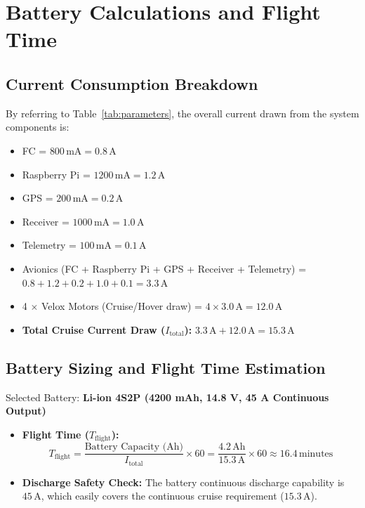 \documentclass[11pt,a4paper]{article}
\begin{document}
\clearpage

\section{Battery Calculations and Flight Time}

\subsection{Current Consumption Breakdown}
By referring to Table~\ref{tab:parameters}, the overall current drawn from the system components is:
\begin{itemize}
    \item FC = $800\,\text{mA} = 0.8\,\text{A}$
    \item Raspberry Pi = $1200\,\text{mA} = 1.2\,\text{A}$
    \item GPS = $200\,\text{mA} = 0.2\,\text{A}$
    \item Receiver = $1000\,\text{mA} = 1.0\,\text{A}$
    \item Telemetry = $100\,\text{mA} = 0.1\,\text{A}$

    \item Avionics (FC + Raspberry Pi + GPS + Receiver + Telemetry) = $0.8 + 1.2 + 0.2 + 1.0 + 0.1 = 3.3\,\text{A}$
    \item 4 $\times$ Velox Motors (Cruise/Hover draw) = $4 \times 3.0\,\text{A} = 12.0\,\text{A}$
    \item \textbf{Total Cruise Current Draw ($I_{\text{total}}$):} $3.3\,\text{A} + 12.0\,\text{A} = 15.3\,\text{A}$
\end{itemize}

\subsection{Battery Sizing and Flight Time Estimation}
Selected Battery: \textbf{Li-ion 4S2P (4200 mAh, 14.8 V, 45 A Continuous Output)}

\begin{itemize}
    \item \textbf{Flight Time ($T_{\text{flight}}$):}
    \begin{equation}
        T_{\text{flight}} = \frac{\text{Battery Capacity (Ah)}}{I_{\text{total}}} \times 60 = \frac{4.2\,\text{Ah}}{15.3\,\text{A}} \times 60 \approx 16.4\,\text{minutes}
    \end{equation}
    
    \item \textbf{Discharge Safety Check:}
    The battery continuous discharge capability is $45\,\text{A}$, which easily covers the continuous cruise requirement ($15.3\,\text{A}$).
\end{itemize}
\end{document}
